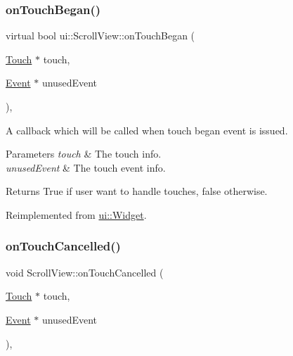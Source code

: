 \mbox{\label{classui_1_1ScrollView_a04c7e9105bf26f9d79cd907c6b23f41d}} 
\subsubsection{\texorpdfstring{on\+Touch\+Began()}{onTouchBegan()}\hspace{0.1cm}{\footnotesize\ttfamily [2/2]}}
{\footnotesize\ttfamily virtual bool ui\+::\+Scroll\+View\+::on\+Touch\+Began (\begin{DoxyParamCaption}\item[{\hyperlink{classTouch}{Touch} $\ast$}]{touch,  }\item[{\hyperlink{classEvent}{Event} $\ast$}]{unused\+Event }\end{DoxyParamCaption})\hspace{0.3cm}{\ttfamily [override]}, {\ttfamily [virtual]}}

A callback which will be called when touch began event is issued. 
\begin{DoxyParams}{Parameters}
{\em touch} & The touch info. \\
\hline
{\em unused\+Event} & The touch event info. \\
\hline
\end{DoxyParams}
\begin{DoxyReturn}{Returns}
True if user want to handle touches, false otherwise. 
\end{DoxyReturn}


Reimplemented from \hyperlink{classui_1_1Widget_a7885c770dde6daef771515c9857674a8}{ui\+::\+Widget}.

\mbox{\label{classui_1_1ScrollView_ab1dd25cb7c32f13d8920b796986f1fea}} 
\subsubsection{\texorpdfstring{on\+Touch\+Cancelled()}{onTouchCancelled()}\hspace{0.1cm}{\footnotesize\ttfamily [1/2]}}
{\footnotesize\ttfamily void Scroll\+View\+::on\+Touch\+Cancelled (\begin{DoxyParamCaption}\item[{\hyperlink{classTouch}{Touch} $\ast$}]{touch,  }\item[{\hyperlink{classEvent}{Event} $\ast$}]{unused\+Event }\end{DoxyParamCaption})\hspace{0.3cm}{\ttfamily [override]}, {\ttfamily [virtual]}}

